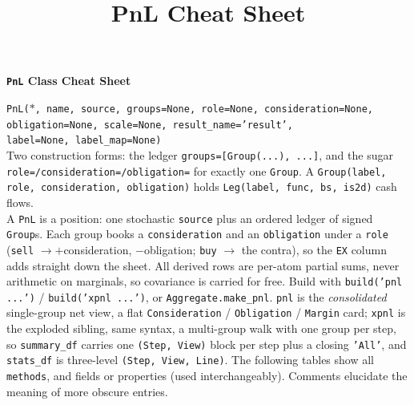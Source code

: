%
%
%


\title{PnL Cheat Sheet}





{\huge{\textbf{\texttt{PnL} Class Cheat Sheet}}}

\raggedright
\texttt{\m PnL($*$, name, source, groups=None, role=None, consideration=None, obligation=None, scale=None, result\_name='result',} \\
\texttt{\phantom{\m}label=None, label\_map=None)} \\
Two construction forms: the ledger \texttt{groups=[Group(...), ...]}, and the sugar \texttt{role=/consideration=/obligation=} for exactly one \texttt{Group}. A \texttt{\m Group(label, role, consideration, obligation)} holds \texttt{\m Leg(label, func, bs, is2d)} cash flows. \\

A \texttt{PnL} is a position: one stochastic \texttt{source} plus an ordered ledger of signed \texttt{Group}s. Each group books a \texttt{consideration} and an \texttt{obligation} under a \texttt{role} (\texttt{sell} $\to +$consideration, $-$obligation; \texttt{buy} $\to$ the contra), so the \texttt{EX} column adds straight down the sheet. All derived rows are per-atom partial sums, never arithmetic on marginals, so covariance is carried for free. Build with \texttt{build('pnl ...')} / \texttt{build('xpnl ...')}, or \texttt{\m Aggregate.make\_pnl}.
\texttt{pnl} is the \emph{consolidated} single-group net view, a flat \texttt{Consideration} / \texttt{Obligation} / \texttt{Margin} card; \texttt{xpnl} is the exploded sibling, same syntax, a multi-group walk with one group per step, so \texttt{summary\_df} carries one \texttt{(Step, View)} block per step plus a closing \texttt{'All'}, and \texttt{stats\_df} is three-level \texttt{(Step, View, Line)}.
The following tables show all \texttt{\m methods}, and fields or properties (used interchangeably). Comments elucidate the meaning of more obscure entries.


